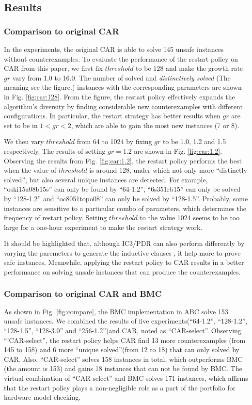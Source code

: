 \subsection{Results}

\subsubsection{Comparison to original CAR}
In the experiments, the original CAR is able to solve 145 unsafe instances without counterexamples.
To evaluate the performance of the restart policy on CAR from this paper, we first fix $threshold$ to be $128$ and make the growth rate $gr$ vary from 1.0 to 16.0. The number of solved and \emph{distinctively solved} (The meaning see the figure.) instances with the corresponding parameters are shown in Fig. \ref{fig:car:128}. From the figure, the restart policy effectively expands the algorithm's diversity by finding considerable new counterexamples with different configurations. In particular, the restart strategy has better results when $gr$ are set to be in $1 < gr < 2$, which are able to gain the most new instances (7 or 8). 


We then vary $threshold$ from 64 to 1024 by fixing $gr$ to be 1.0, 1.2 and 1.5 respectively. The results of setting $gr=1.2$ are shown in 
Fig. \ref{fig:car:1.2}. Observing the results from Fig. \ref{fig:car:1.2}, the restart policy performs the best when the value of $threshold$ is around 128, under which not only more ``distinctly solved'', but also several unique instances are detected. For example, ``oski15a08b15s'' can only be found by ``64-1.2'', ``6s351rb15'' can only be solved by ``128-1.2'' and ``oc8051topo08'' can only be solved by ``128-1.5''. Probably, some instances are sensitive to a particular combo of parameters, which determines the frequency of restart policy. Setting $threshold$ to the value 1024 seems to be too large for a one-hour experiment to make the restart strategy work. 

It should be highlighted that, although IC3/PDR can also perform differently by varying the paremeters to generate the inductive clauses \cite{GR16}, it help more to prove safe instances. Meanwhile, applying the restart policy to CAR results in a better performance on solving unsafe instances that can produce the counterexamples. 

\subsubsection{Comparison to original CAR and BMC }
As shown in Fig. \ref{fig:compare}, the BMC implementation in ABC solve 153 unsafe instances. We combined the results of five experiments(``64-1.2'', ``128-1.2'', ``128-1.5'', ``128-3.0'' and ``256-1.2'')and CAR, noted as ``CAR-select''. Observing ``'CAR-select'', the restart policy helps CAR find 13 more counterexamples (from 145 to 158) and 6 more ``unique solved''(from 12 to 18) that can only solved by CAR. Also, ``CAR-select'' solves 158 instances in total, which outperforms BMC (the amount is 153) and gains 18 instances that can not be found by BMC. The virtual combination of ``CAR-select'' and BMC solves 171 instances, which affirms that the restart policy plays a non-negligible role as a part of the portfolio for hardware model checking.
